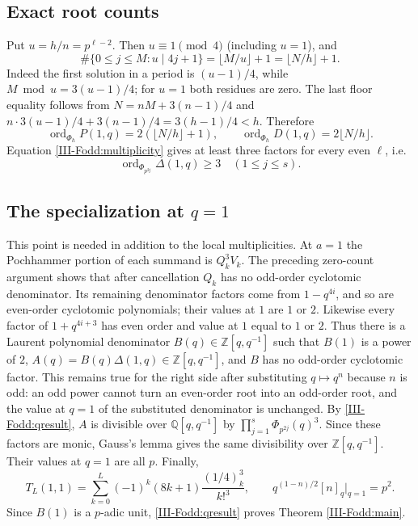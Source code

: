\documentclass[11pt,letterpaper]{article}
\numberwithin{equation}{section}
\newcommand{\vp}{\operatorname{ord}}
\newcommand{\LocalAppendix}{\setcounter{section}{0}\setcounter{subsection}{0}\renewcommand{\thesection}{\Alph{section}}}
\begin{document}
\subsection{Exact root counts}
Put $u=h/n=p^{\ell-2}$. Then $u\equiv1\pmod4$ (including $u=1$),
and
\[
 \#\{0\le j\le M:u\mid4j+1\}
 =\lfloor M/u\rfloor+1=\lfloor N/h\rfloor+1.
\]
Indeed the first solution in a period is $(u-1)/4$, while
$M\bmod u=3(u-1)/4$; for $u=1$ both residues are zero.
The last floor equality follows from
$N=nM+3(n-1)/4$ and
$n\cdot3(u-1)/4+3(n-1)/4=3(h-1)/4<h$.
Therefore
\[
 \vp_{\Phi_h}P(1,q)=2(\lfloor N/h\rfloor+1),\qquad
 \vp_{\Phi_h}D(1,q)=2\lfloor N/h\rfloor.
\]
Equation \eqref{III-Fodd:multiplicity} gives at least three factors for every
even $\ell$, i.e.
\begin{equation}\label{III-Fodd:qresult}
 \vp_{\Phi_{p^{2j}}}\Delta(1,q)\ge3\quad(1\le j\le s).
\end{equation}

\subsection{The specialization at \texorpdfstring{$q=1$}{q=1}}
This point is needed in addition to the local multiplicities.
At $a=1$ the Pochhammer portion of each summand is
$Q_k^3V_k$. The preceding zero-count argument shows that after
cancellation $Q_k$ has no odd-order cyclotomic denominator.
Its remaining denominator factors come from $1-q^{4i}$, and so are
even-order cyclotomic polynomials; their values at $1$ are $1$ or $2$.
Likewise every factor of $1+q^{4i+3}$ has even order and value at $1$
equal to $1$ or $2$. Thus there is a Laurent polynomial denominator
$B(q)\in\mathbb Z[q,q^{-1}]$ such that $B(1)$ is a power of $2$,
$A(q)=B(q)\Delta(1,q)\in\mathbb Z[q,q^{-1}]$, and $B$ has no
odd-order cyclotomic factor. This remains true for the right side
after substituting $q\mapsto q^n$ because $n$ is odd: an odd power
cannot turn an even-order root into an odd-order root, and the value
at $q=1$ of the substituted denominator is unchanged.
By \eqref{III-Fodd:qresult}, $A$ is divisible over $\mathbb Q[q,q^{-1}]$ by
$\prod_{j=1}^s\Phi_{p^{2j}}(q)^3$. Since these factors are monic,
Gauss's lemma gives the same divisibility over
$\mathbb Z[q,q^{-1}]$. Their values at $q=1$ are all $p$.
Finally,
\[
 T_L(1,1)=\sum_{k=0}^L(-1)^k(8k+1)\frac{(1/4)_k^3}{k!^3},
 \qquad q^{(1-n)/2}[n]_q\big|_{q=1}=p^2.
\]
Since $B(1)$ is a $p$-adic unit, \eqref{III-Fodd:qresult} proves
Theorem \ref{III-Fodd:main}.

\LocalAppendix
\end{document}

